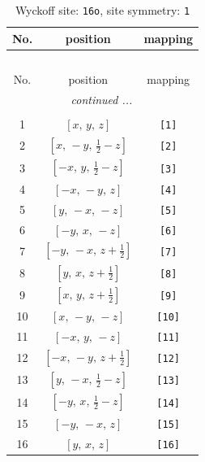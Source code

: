 \documentclass[fleqn,8pt]{jsarticle}
\begin{document}
\begin{longtable}{ccc}
\caption{Wyckoff site: {\tt 16o}, site symmetry: {\tt 1}}
 \\
 \hline \hline
No. & position & mapping \\ \hline \endfirsthead

\multicolumn{2}{l}{\tablename\ \thetable{}} \\
 \hline \hline
No. & position & mapping \\ \hline \endhead

 \hline \hline
\multicolumn{2}{r}{\footnotesize\it continued ...} \\ \endfoot

 \hline \hline
\multicolumn{2}{r}{} \\ \endlastfoot

1 & $\left[ x,\, y,\, z \right]$ & {\tt [1]} \\ \hline
2 & $\left[ x,\, - y,\, \frac{1}{2} - z \right]$ & {\tt [2]} \\ \hline
3 & $\left[ - x,\, y,\, \frac{1}{2} - z \right]$ & {\tt [3]} \\ \hline
4 & $\left[ - x,\, - y,\, z \right]$ & {\tt [4]} \\ \hline
5 & $\left[ y,\, - x,\, - z \right]$ & {\tt [5]} \\ \hline
6 & $\left[ - y,\, x,\, - z \right]$ & {\tt [6]} \\ \hline
7 & $\left[ - y,\, - x,\, z + \frac{1}{2} \right]$ & {\tt [7]} \\ \hline
8 & $\left[ y,\, x,\, z + \frac{1}{2} \right]$ & {\tt [8]} \\ \hline
9 & $\left[ x,\, y,\, z + \frac{1}{2} \right]$ & {\tt [9]} \\ \hline
10 & $\left[ x,\, - y,\, - z \right]$ & {\tt [10]} \\ \hline
11 & $\left[ - x,\, y,\, - z \right]$ & {\tt [11]} \\ \hline
12 & $\left[ - x,\, - y,\, z + \frac{1}{2} \right]$ & {\tt [12]} \\ \hline
13 & $\left[ y,\, - x,\, \frac{1}{2} - z \right]$ & {\tt [13]} \\ \hline
14 & $\left[ - y,\, x,\, \frac{1}{2} - z \right]$ & {\tt [14]} \\ \hline
15 & $\left[ - y,\, - x,\, z \right]$ & {\tt [15]} \\ \hline
16 & $\left[ y,\, x,\, z \right]$ & {\tt [16]} \\
\end{longtable}
\end{document}
